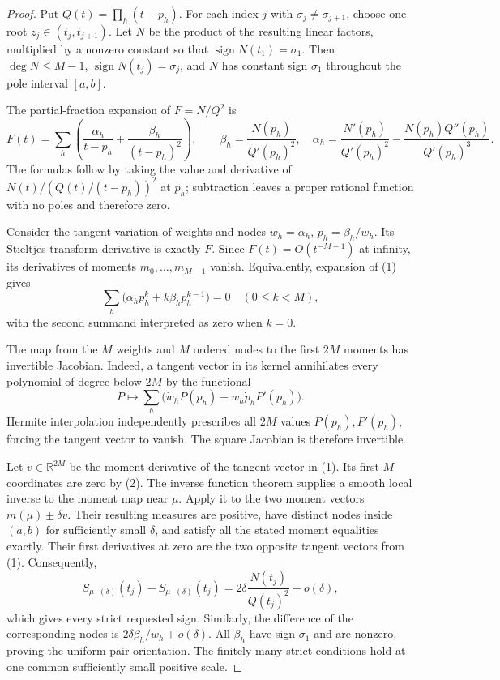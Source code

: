 \documentclass[11pt]{article}
\begin{document}
\begin{proof}
Put $Q(t)=\prod_h(t-p_h)$. For each index $j$ with
$\sigma_j\ne\sigma_{j+1}$, choose one root $z_j\in(t_j,t_{j+1})$.
Let $N$ be the product of the resulting linear factors, multiplied by a
nonzero constant so that $\operatorname{sign}N(t_1)=\sigma_1$.
Then $\deg N\leq M-1$, $\operatorname{sign}N(t_j)=\sigma_j$, and
$N$ has constant sign $\sigma_1$ throughout the pole interval $[a,b]$.

The partial-fraction expansion of $F=N/Q^2$ is
\[
 F(t)=\sum_h\left(\frac{\alpha_h}{t-p_h}
                  +\frac{\beta_h}{(t-p_h)^2}\right),\qquad
 \beta_h=\frac{N(p_h)}{Q'(p_h)^2},\quad
 \alpha_h=\frac{N'(p_h)}{Q'(p_h)^2}
          -\frac{N(p_h)Q''(p_h)}{Q'(p_h)^3}.              \tag{1}
\]
The formulas follow by taking the value and derivative of
$N(t)/(Q(t)/(t-p_h))^2$ at $p_h$; subtraction leaves a proper rational
function with no poles and therefore zero.

Consider the tangent variation of weights and nodes
$\dot w_h=\alpha_h$, $\dot p_h=\beta_h/w_h$.
Its Stieltjes-transform derivative is exactly $F$.
Since $F(t)=O(t^{-M-1})$ at infinity, its derivatives of moments
$m_0,\ldots,m_{M-1}$ vanish. Equivalently, expansion of (1) gives
\[
 \sum_h\bigl(\alpha_h p_h^k+k\beta_h p_h^{k-1}\bigr)=0
 \quad(0\leq k<M),                                    \tag{2}
\]
with the second summand interpreted as zero when $k=0$.

The map from the $M$ weights and $M$ ordered nodes to the first $2M$
moments has invertible Jacobian. Indeed, a tangent vector in its kernel
annihilates every polynomial of degree below $2M$ by the functional
\[
 P\longmapsto\sum_h\bigl(\dot w_hP(p_h)
                              +w_h\dot p_hP'(p_h)\bigr).
\]
Hermite interpolation independently prescribes all $2M$ values
$P(p_h),P'(p_h)$, forcing the tangent vector to vanish.
The square Jacobian is therefore invertible.

Let $v\in\mathbb R^{2M}$ be the moment derivative of the tangent
vector in (1). Its first $M$ coordinates are zero by (2).
The inverse function theorem supplies a smooth local inverse to the
moment map near $\mu$. Apply it to the two moment vectors
$m(\mu)\pm\delta v$. Their resulting measures are positive, have distinct
nodes inside $(a,b)$ for sufficiently small $\delta$, and satisfy all
the stated moment equalities exactly. Their first derivatives at zero
are the two opposite tangent vectors from (1). Consequently,
\[
 S_{\mu_+(\delta)}(t_j)-S_{\mu_-(\delta)}(t_j)
      =2\delta\frac{N(t_j)}{Q(t_j)^2}+o(\delta),
\]
which gives every strict requested sign. Similarly, the difference of
the corresponding nodes is
$2\delta\beta_h/w_h+o(\delta)$.
All $\beta_h$ have sign $\sigma_1$ and are nonzero, proving the uniform
pair orientation. The finitely many strict conditions hold at one
common sufficiently small positive scale.
\end{proof}
\end{document}

